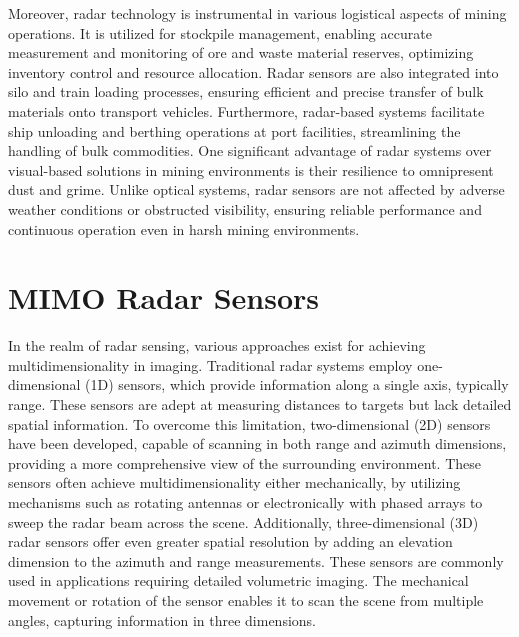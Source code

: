 Moreover, radar technology is instrumental in various logistical aspects of mining operations.
It is utilized for stockpile management, enabling accurate measurement and monitoring of ore and waste material reserves,
optimizing inventory control and resource allocation.
Radar sensors are also integrated into silo and train loading processes, ensuring efficient and precise transfer of bulk materials onto transport vehicles.
Furthermore, radar-based systems facilitate ship unloading and berthing operations at port facilities, streamlining the handling of bulk commodities.
One significant advantage of radar systems over visual-based solutions in mining environments is their resilience to omnipresent dust and grime.
Unlike optical systems, radar sensors are not affected by adverse weather conditions or obstructed visibility,
ensuring reliable performance and continuous operation even in harsh mining environments.\\

\section{MIMO Radar Sensors}
In the realm of radar sensing, various approaches exist for achieving multidimensionality in imaging.
Traditional radar systems employ one-dimensional (1D) sensors, which provide information along a single axis, typically range.
These sensors are adept at measuring distances to targets but lack detailed spatial information.
To overcome this limitation, two-dimensional (2D) sensors have been developed,
capable of scanning in both range and azimuth dimensions, providing a more comprehensive view of the surrounding environment.
These sensors often achieve multidimensionality either mechanically,
by utilizing mechanisms such as rotating antennas or electronically with phased arrays to sweep the radar beam across the scene.
Additionally, three-dimensional (3D) radar sensors offer even greater spatial resolution by adding an elevation dimension to the azimuth and range measurements.
These sensors are commonly used in applications requiring detailed volumetric imaging.
The mechanical movement or rotation of the sensor enables it to scan the scene from multiple angles, capturing information in three dimensions.\\

